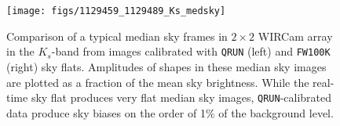 \documentclass[iop]{emulateapj}
\newcommand{\ie}{\textit{i.e.,~}}
\newcommand{\todo}[1]{\textcolor{BurntOrange}{\textsf{#1}}} %
\newcommand{\mycomment}[1]{\textcolor{OliveGreen}{\textit{#1}}} %
\newcommand{\Fig}[1]{Fig.~\ref{fig:#1}}  %
\newcommand{\Sec}[1]{\S\ref{sec:#1}}  %
\begin{document}





\begin{figure}[t]
\centering
\texttt{[image: figs/1129459\_1129489\_Ks\_medsky]}
\caption{Comparison of a typical median sky frames in $2\times 2$ WIRCam array in the $K_s$-band from images calibrated with \texttt{QRUN} (left) and \texttt{FW100K} (right) sky flats.
Amplitudes of shapes in these median sky images are plotted as a fraction of the mean sky brightness.
While the real-time sky flat produces very flat median sky images, \texttt{QRUN}-calibrated data produce sky biases on the order of 1\% of the background level.
}
\label{fig:median_sky_images}
\end{figure}
\end{document}
